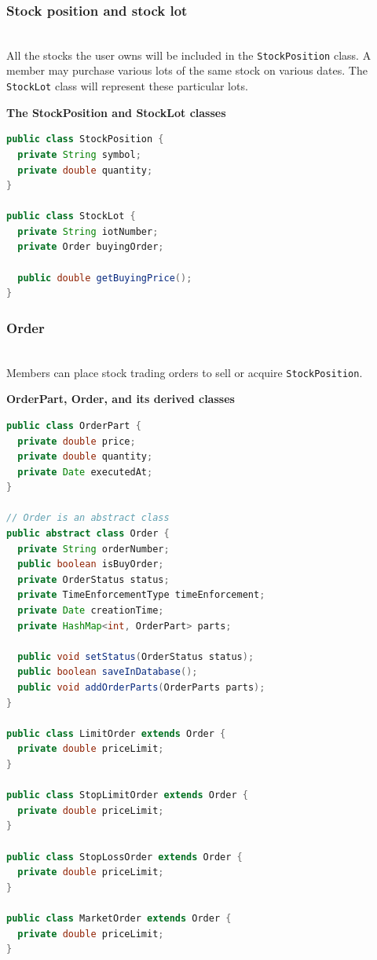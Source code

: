 \subsubsection{Stock position and stock lot}\label{Hpa-z3TKp0HOtc1gDlebp}
\\
All the stocks the user owns will be included in the \texttt{StockPosition} class. A member may purchase various lots of the same stock on various dates. The
\texttt{StockLot} class will represent these particular lots.

\textbf{The StockPosition and StockLot classes}

\begin{lstlisting}[language=Java]
public class StockPosition {
  private String symbol;
  private double quantity;
}

public class StockLot {
  private String iotNumber;
  private Order buyingOrder;

  public double getBuyingPrice();
}
\end{lstlisting}

\subsubsection{Order}\label{zQGXHbZZH18ujr5z8za9e}
\\
Members can place stock trading orders to sell or acquire \texttt{StockPosition}.

\textbf{OrderPart, Order, and its derived classes}

\begin{lstlisting}[language=Java]
public class OrderPart {
  private double price;
  private double quantity;
  private Date executedAt;
}

// Order is an abstract class
public abstract class Order {
  private String orderNumber;
  public boolean isBuyOrder;
  private OrderStatus status;
  private TimeEnforcementType timeEnforcement;
  private Date creationTime;
  private HashMap<int, OrderPart> parts;

  public void setStatus(OrderStatus status);
  public boolean saveInDatabase();
  public void addOrderParts(OrderParts parts);
}

public class LimitOrder extends Order {
  private double priceLimit;
}

public class StopLimitOrder extends Order {
  private double priceLimit;
}

public class StopLossOrder extends Order {
  private double priceLimit;
}

public class MarketOrder extends Order {
  private double priceLimit;
}
\end{lstlisting}

